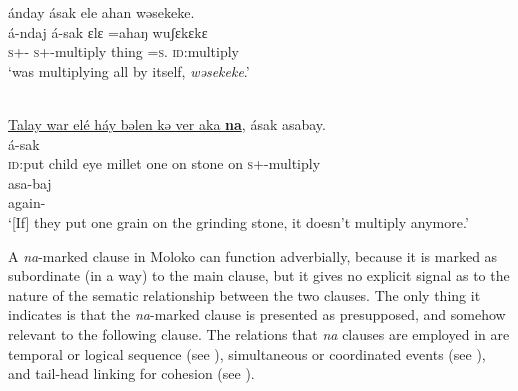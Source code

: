       \medskip
ánday  ásak  ele  ahan  wəsekeke. \\      
\gll á-ndaj á-sak   ɛlɛ      =ahaŋ  wuʃɛkɛkɛ\\
     \textsc{s}+{\IFV}-{\PRG}  \textsc{s}+{\IFV}-multiply   thing  =\textsc{s}.{\POSS}   \textsc{id}:multiply\\
\glt  ‘was multiplying all by itself, \textit{wəsekeke}.’
\z

\ea \label{ex:11:14}
\\
\underline{Talay  war  elé  háy  bəlen  kə  ver  aka  \textbf{na}},  ásak  asabay. \\
\gll  {}          á-sak  \\
      \textsc{id}:put  child  eye  millet  one  on  stone  on  {\PSP} \textsc{s}+{\IFV}-multiply  \\
      
      \medskip
\gll asa-baj\\
      again-{\NEG}\\
\glt  ‘[If] they put one grain on the grinding stone, it doesn’t multiply anymore.’
\z

\largerpage
A \textit{na}{}-marked clause in Moloko can function adverbially, because it is marked as subordinate (in a way) to the main clause, but it gives no explicit signal as to the nature of the sematic relationship between the two clauses.  The only thing it indicates is that the \textit{na}{}-marked clause is presented as presupposed, and somehow relevant to the following clause. The relations that \textit{na} clauses are employed in are temporal or logical sequence (see ), simultaneous or coordinated events (see ), and tail-head linking for cohesion (see ).

